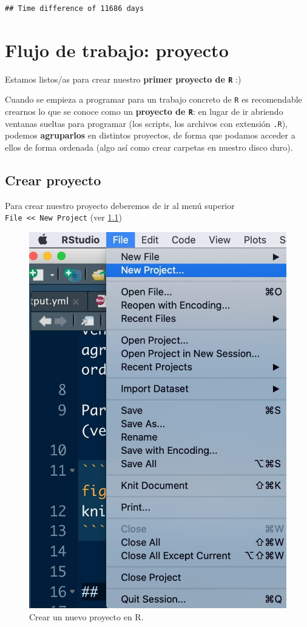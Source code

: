 \documentclass[11pt,]{book}
\begin{document}
\begin{verbatim}
## Time difference of 11686 days
\end{verbatim}

\hypertarget{flujo-de-trabajo-proyecto}{%
\chapter{Flujo de trabajo: proyecto}\label{flujo-de-trabajo-proyecto}}

Estamos listos/as para crear nuestro \textbf{primer proyecto de \texttt{R}} :)

Cuando se empieza a programar para un trabajo concreto de \texttt{R} es recomendable crearnos lo que se conoce como un \textbf{proyecto de \texttt{R}}: en lugar de ir abriendo ventanas sueltas para programar (los scripts, los archivos con extensión \texttt{.R}), podemos \textbf{agruparlos} en distintos proyectos, de forma que podamos acceder a ellos de forma ordenada (algo así como crear carpetas en nuestro disco duro).

\hypertarget{crear-proyecto}{%
\section{Crear proyecto}\label{crear-proyecto}}

Para crear nuestro proyecto deberemos de ir al menú superior \texttt{File\ \textless{}\textless{}\ New\ Project} (ver \ref{fig:crear-proyecto1})

\begin{figure}

{\centering \includegraphics[width=0.5\linewidth]{./img/crear_proyecto1} 

}

\caption{Crear un nuevo proyecto en R.}\label{fig:crear-proyecto1}
\end{figure}
\end{document}
